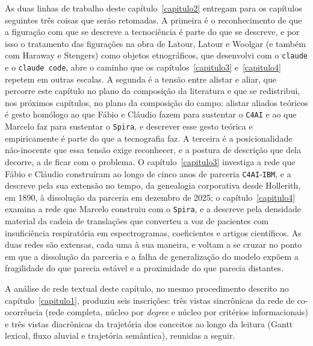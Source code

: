 As duas linhas de trabalho deste capítulo~\ref{capitulo2} entregam para os capítulos seguintes três coisas que serão retomadas. A primeira é o reconhecimento de que a figuração com que se descreve a tecnociência é parte do que se descreve, e por isso o tratamento das figurações na obra de Latour, Latour e Woolgar (e também com Haraway e Stengers) como objetos etnográficos, que desenvolvi com o \texttt{claude} e o \texttt{claude code}, abre o caminho que os capítulos~\ref{capitulo3} e~\ref{capitulo4} repetem em outras escalas. A segunda é a tensão entre alistar e aliar, que percorre este capítulo no plano da composição da literatura e que se redistribui, nos próximos capítulos, no plano da composição do campo: alistar aliados teóricos é gesto homólogo ao que Fábio e Cláudio fazem para sustentar o \texttt{C4AI} e ao que Marcelo faz para sustentar o \texttt{Spira}, e descrever esse gesto teórica e empiricamente é parte do que a tecnografia faz. A terceira é a posicionalidade não-inocente que essa tensão exige reconhecer, e a postura de descrição que dela decorre, a de ficar com o problema. O capítulo~\ref{capitulo3} investiga a rede que Fábio e Cláudio construíram ao longo de cinco anos de parceria \texttt{C4AI}-\texttt{IBM}, e a descreve pela sua extensão no tempo, da genealogia corporativa desde Hollerith, em 1890, à dissolução da parceria em dezembro de 2025; o capítulo~\ref{capitulo4} examina a rede que Marcelo construiu com o \texttt{Spira}, e a descreve pela densidade material da cadeia de translações que converteu a voz de pacientes com insuficiência respiratória em espectrogramas, coeficientes e artigos científicos. As duas redes são extensas, cada uma à sua maneira, e voltam a se cruzar no ponto em que a dissolução da parceria e a falha de generalização do modelo expõem a fragilidade do que parecia estável e a proximidade do que parecia distantes.

\medskip

A análise de rede textual deste capítulo, no mesmo procedimento descrito no capítulo~\ref{capitulo1}, produziu seis inscrições: três vistas sincrônicas da rede de co-ocorrência (rede completa, núcleo por \textit{degree} e núcleo por critérios informacionais) e três vistas diacrônicas da trajetória dos conceitos ao longo da leitura (Gantt lexical, fluxo aluvial e trajetória semântica), reunidas a seguir.

